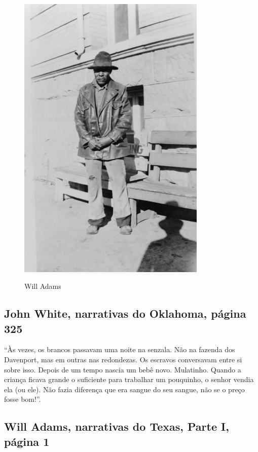 \pagebreak
\thispagestyle{empty}
\begin{figure}[!ht]
\centering
 \includegraphics[width=90mm]{./imgs/willadams_recorte.jpg} \label{img14}
\caption{Will Adams}
\end{figure}

\subsection{John White, narrativas do Oklahoma, página 325}
\label{ref284}

``Às vezes, os brancos passavam uma noite na senzala. Não na fazenda dos
Davenport, mas em outras nas redondezas. Os escravos conversavam entre
si sobre isso. Depois de um tempo nascia um bebê novo. Mulatinho. Quando
a criança ficava grande o suficiente para trabalhar um pouquinho, o
senhor vendia ela (ou ele). Não fazia diferença que era sangue do seu
sangue, não se o preço fosse bom!''.

\subsection{Will Adams, narrativas do Texas, Parte I, página 1} \label{ref03}

